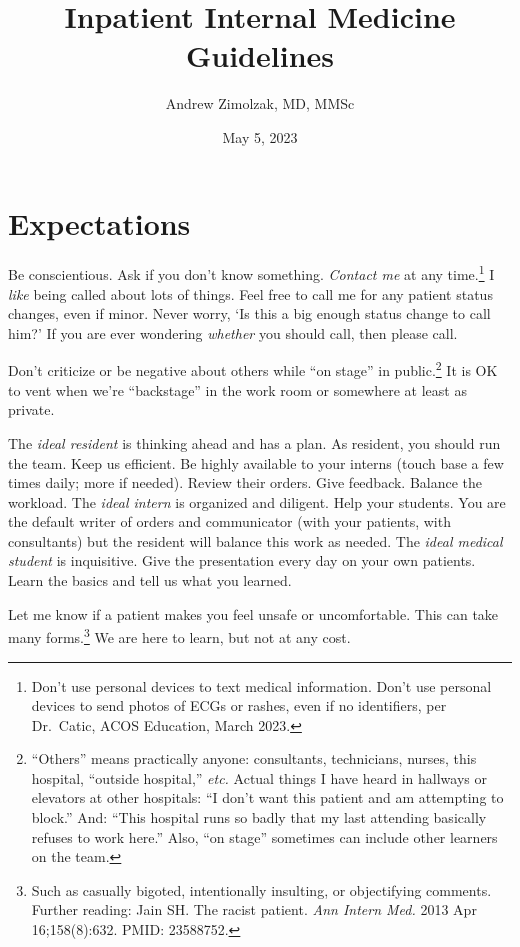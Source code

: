 \documentclass{tufte-handout}
\title{Inpatient Internal Medicine Guidelines}
\author{Andrew Zimolzak, MD, MMSc}
\date{May 5, 2023}
\begin{document}
\maketitle

\section{Expectations}

Be conscientious. Ask if you don't know something. \emph{Contact me}
at any time.\footnote{Don't use personal devices to text medical
information. Don't use personal devices to send photos of ECGs or
rashes, even if no identifiers, per Dr.\ Catic, ACOS Education, March
2023.} I \emph{like} being called about lots of things. Feel free to
call me for any patient status changes, even if minor. Never worry,
`Is this a big enough status change to call him?' If you are ever
wondering \emph{whether} you should call, then please call.

Don't criticize or be negative about others while ``on stage'' in
public.\footnote{``Others'' means
practically anyone: consultants, technicians, nurses, this hospital,
``outside hospital,'' \emph{etc.} Actual things I have heard in
hallways or elevators at other hospitals: ``I don't want this patient and am
attempting to block.'' And: ``This hospital runs so badly that my last
attending basically refuses to work here.'' Also, ``on stage''
sometimes can include other learners on the team.} It is
OK to vent when we're ``backstage'' in the work room or somewhere at
least as private.

The \emph{ideal resident} is thinking ahead and has a plan. As
resident, you should run the team. Keep us efficient. Be highly
available to your interns (touch base a few times daily; more if
needed). Review their orders. Give feedback. Balance the workload. The
\emph{ideal intern} is organized and diligent. Help your students. You
are the default writer of orders and communicator (with your patients,
with consultants) but the resident will balance this work as needed.
The \emph{ideal medical student} is inquisitive. Give the presentation
every day on your own patients. Learn the basics and tell us what you
learned.

Let me know if a patient makes you feel unsafe or uncomfortable. This
can take many forms.\footnote{Such as casually bigoted, intentionally
insulting, or objectifying comments. Further reading: Jain SH. The
racist patient. \emph{Ann Intern Med.} 2013 Apr 16;158(8):632. PMID:
23588752.} We are here to learn, but not at any cost.
\end{document}
